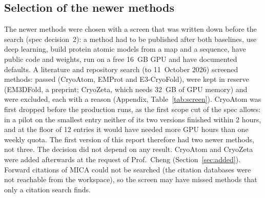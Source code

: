 \subsection{Selection of the newer methods}\label{sec:screen}
The newer methods were chosen with a screen that was written down before the search (spec decision~2): a method had to be published after both baselines, use deep learning, build protein atomic models from a map and a sequence, have public code and weights, run on a free 16~GB GPU and have documented defaults. A literature and repository search (to 11~October 2026) screened \NScreened{} methods: \NScreenPassed{} passed (CryoAtom, EMProt and E3-CryoFold), \NScreenReserve{} were kept in reserve (EM3DFold, a preprint; CryoZeta, which needs 32~GB of GPU memory) and \NScreenExcluded{} were excluded, each with a reason (Appendix, Table~\ref{tab:screen}). CryoAtom \citep{su2026cryoatom} was first dropped before the production runs, as the first scope cut of the spec allows: in a pilot on the smallest entry neither of its two versions finished within 2 hours, and at the floor of 12 entries it would have needed more GPU hours than one weekly quota. The first version of this report therefore had two newer methods, not three. The decision did not depend on any result. CryoAtom and CryoZeta were added afterwards at the request of Prof.\ Cheng (Section~\ref{sec:added}). Forward citations of MICA could not be searched (the citation databases were not reachable from the workspace), so the screen may have missed methods that only a citation search finds.

